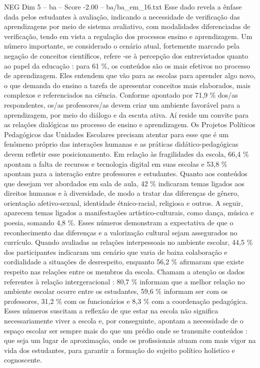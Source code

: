 \begin{textsample}{NEG Dim 5 – ba – Score -2.00 – ba/ba\_em\_16.txt}
Esse dado revela a ênfase dada pelos estudantes à avaliação, indicando a necessidade de verificação das aprendizagens por meio de sistema avaliativo, com modalidades diferenciadas de verificação, tendo em vista a regulação dos processos ensino e aprendizagem.
Um número importante, se considerado o cenário atual, fortemente marcado pela negação de conceitos científicos, refere -se à percepção dos entrevistados quanto ao papel da educação : para 61 \%, os conteúdos são os mais efetivos no processo de aprendizagem.
Eles entendem que vão para as escolas para aprender algo novo, o que demanda do ensino a tarefa de apresentar conceitos mais elaborados, mais complexos e referenciados na ciência.
Conforme apontado por 71,9 \% dos/as respondentes, os/as professores/as devem criar um ambiente favorável para a aprendizagem, por meio do diálogo e da escuta ativa.
Aí reside um convite para as relações dialógicas no processo de ensino e aprendizagem.
Os Projetos Políticos Pedagógicos das Unidades Escolares precisam atentar para esse que é um fenômeno próprio das interações humanas e as práticas didático-pedagógicas devem refletir esse posicionamento.
Em relação às fragilidades da escola, 66,4 \% apontam a falta de recursos e tecnologia digital em suas escolas e 53,8 \% apontam para a interação entre professores e estudantes.
Quanto aos conteúdos que desejam ver abordados em sala de aula, 42 \% indicaram temas ligados aos direitos humanos e à diversidade, de modo a tratar das diferenças de gênero, orientação afetivo-sexual, identidade étnico-racial, religiosa e outros.
A seguir, aparecem temas ligados a manifestações artístico-culturais, como dança, música e poesia, somando 4,8 \%.
Esses números demonstram a expectativa de que o reconhecimento das diferenças e a valorização cultural sejam assegurados no currículo.
Quando avaliadas as relações interpessoais no ambiente escolar, 44,5 \% dos participantes indicaram um cenário que varia de baixa colaboração e cordialidade a situações de desrespeito, enquanto 56,2 \% afirmaram que existe respeito nas relações entre os membros da escola.
Chamam a atenção os dados referentes à relação intergeracional : 80,7 \% informam que a melhor relação no ambiente escolar ocorre entre os estudantes, 59,6 \% informam ser com os professores, 31,2 \% com os funcionários e 8,3 \% com a coordenação pedagógica.
Esses números suscitam a reflexão de que estar na escola não significa necessariamente viver a escola e, por conseguinte, apontam a necessidade de o espaço escolar ser sempre mais do que um prédio onde se transmite conteúdos : que seja um lugar de aproximação, onde os profissionais atuam com mais vigor na vida dos estudantes, para garantir a formação do sujeito político holístico e cognoscente.

\end{textsample}
